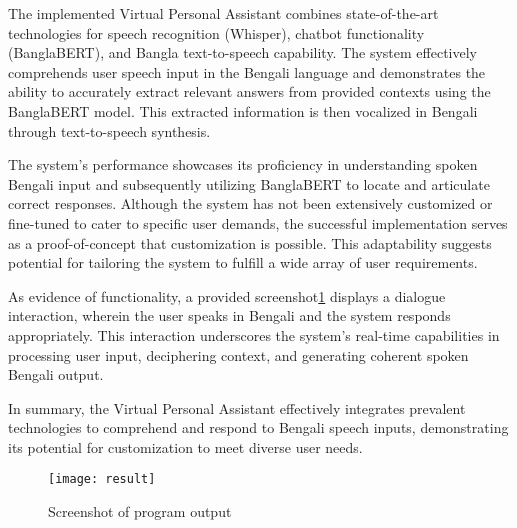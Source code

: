 The implemented Virtual Personal Assistant combines state-of-the-art technologies for speech recognition (Whisper), chatbot functionality (BanglaBERT), and Bangla text-to-speech capability.
The system effectively comprehends user speech input in the Bengali language and demonstrates the ability to accurately extract relevant answers from provided contexts using the BanglaBERT model.
This extracted information is then vocalized in Bengali through text-to-speech synthesis.

The system's performance showcases its proficiency in understanding spoken Bengali input and subsequently utilizing BanglaBERT to locate and articulate correct responses.
Although the system has not been extensively customized or fine-tuned to cater to specific user demands, the successful implementation serves as a proof-of-concept that customization is possible.
This adaptability suggests potential for tailoring the system to fulfill a wide array of user requirements.

As evidence of functionality, a provided screenshot\ref{fig:result} displays a dialogue interaction, wherein the user speaks in Bengali and the system responds appropriately.
This interaction underscores the system's real-time capabilities in processing user input, deciphering context, and generating coherent spoken Bengali output.

In summary, the Virtual Personal Assistant effectively integrates prevalent technologies to comprehend and respond to Bengali speech inputs, demonstrating its potential for customization to meet diverse user needs.

\begin{figure}
    \centering
    \texttt{[image: result]}
    \caption{Screenshot of program output}\label{fig:result}
\end{figure}
